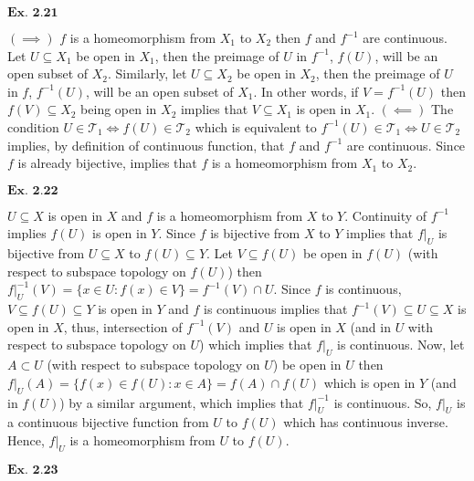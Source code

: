 \documentclass{article}
\begin{document}
\vspace{0.2in}

${\textbf{Ex. 2.21}}$

$(\implies)$ $f$ is a homeomorphism from $X_1$ to $X_2$ then $f$ and $f^{-1}$ are continuous. Let $U \subseteq X_1$ be open in $X_1$, then the preimage of $U$ in $f^{-1}$, $f(U)$, will be an open subset of $X_2$. Similarly, let $U \subseteq X_2$ be open in $X_2$, then the preimage of $U$ in $f$, $f^{-1}(U)$, will be an open subset of $X_1$. In other words, if $V = f^{-1}(U)$ then $f(V) \subseteq X_2$ being open in $X_2$ implies that $V \subseteq X_1$ is open in $X_1$. $(\impliedby)$ The condition $U \in \mathcal{T}_{1} \iff f(U) \in \mathcal{T}_{2}$ which is equivalent to $f^{-1}(U) \in \mathcal{T}_{1} \iff U \in \mathcal{T}_{2}$ implies, by definition of continuous function, that $f$ and $f^{-1}$ are continuous. Since $f$ is already bijective, implies that $f$ is a homeomorphism from $X_1$ to $X_2$.

\vspace{0.2in}

${\textbf{Ex. 2.22}}$

$U\subseteq X$ is open in $X$ and $f$ is a homeomorphism from $X$ to $Y$. Continuity of $f^{-1}$ implies $f(U)$ is open in $Y$. Since $f$ is bijective from $X$ to $Y$ implies that $f\big\vert_{U}$ is bijective from $U \subseteq X$ to $f(U) \subseteq Y$. Let $V \subseteq f(U)$ be open in $f(U)$ (with respect to subspace topology on $f(U)$) then $f\big\vert_{U}^{-1}(V) = \{x \in U: f(x) \in V\} = f^{-1}(V) \cap U$. Since $f$ is continuous, $V \subseteq f(U) \subseteq Y$ is open in $Y$ and $f$ is continuous implies that $f^{-1}(V)\subseteq U \subseteq X$ is open in $X$, thus, intersection of $f^{-1}(V)$ and $U$ is open in $X$ (and in $U$ with respect to subspace topology on $U$) which implies that $f\big\vert_{U}$ is continuous. Now, let $A \subset U$ (with respect to subspace topology on $U$) be open in $U$ then $f\big\vert_{U}(A) = \{f(x)\in f(U): x \in A\} = f(A) \cap f(U)$ which is open in $Y$ (and in $f(U)$) by a similar argument, which implies that $f\big\vert_{U}^{-1}$ is continuous. So, $f\big\vert_{U}$ is a continuous bijective function from $U$ to $f(U)$ which has continuous inverse. Hence, $f\big\vert_{U}$ is a homeomorphism from $U$ to $f(U)$.

\vspace{0.2in}

${\textbf{Ex. 2.23}}$
\end{document}
